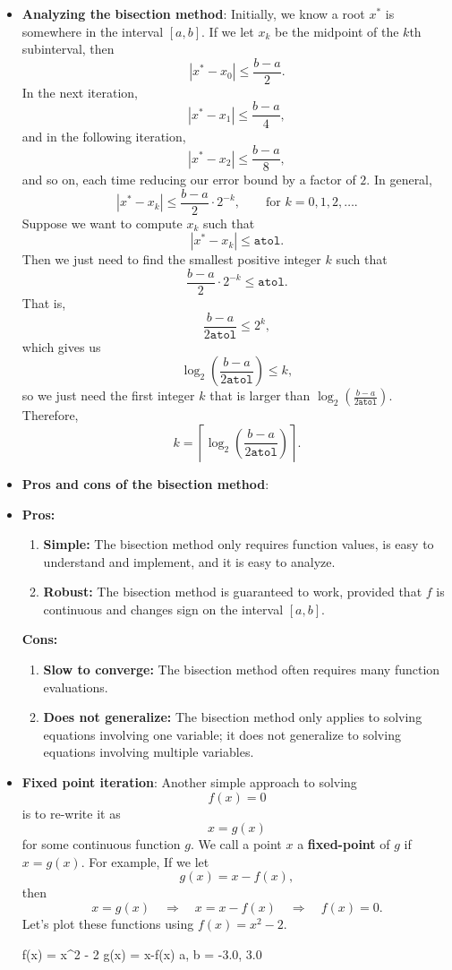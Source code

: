 \documentclass{report}
\begin{document}
\begin{itemize}
\item \textbf{Analyzing the bisection method}:
    Initially, we know a root $x^*$ is somewhere in the interval $[a,b]$. If we let $x_k$ be the midpoint of the $k$th subinterval, then
    $$\left|x^* - x_0\right| \leq \frac{b-a}{2}.$$
    In the next iteration, 
    $$\left|x^* - x_1\right| \leq \frac{b-a}{4},$$
    and in the following iteration,
    $$\left|x^* - x_2\right| \leq \frac{b-a}{8},$$
    and so on, each time reducing our error bound by a factor of $2$.
    In general,
    $$\left|x^* - x_k\right| \leq \frac{b-a}{2} \cdot 2^{-k}, 
    \qquad \text{for $k = 0,1,2,\ldots$}.$$
    Suppose we want to compute $x_k$ such that 
    $$\left|x^* - x_k\right| \leq \mathtt{atol}.$$
    Then we just need to find the smallest positive integer $k$ such that
    $$\frac{b-a}{2} \cdot 2^{-k} \leq \mathtt{atol}.$$
    That is,
    $$\frac{b-a}{2\mathtt{atol}} \leq 2^k,$$
    which gives us
    $$\log_2\left(\frac{b-a}{2\mathtt{atol}}\right) \leq k,$$
    so we just need the first integer $k$ that is larger than $\log_2\left(\frac{b-a}{2\mathtt{atol}}\right)$. Therefore, 
    $$k = \left\lceil \log_2\left(\frac{b-a}{2\mathtt{atol}}\right) \right\rceil.$$
\item \textbf{Pros and cons of the bisection method}:
\item \textbf{Pros:}
    \begin{enumerate}
        \item \textbf{Simple:} The bisection method only requires function values, is easy to understand and implement, and it is easy to analyze.
        \item \textbf{Robust:} The bisection method is guaranteed to work, provided that $f$ is continuous and changes sign on the interval $[a,b]$.
    \end{enumerate}
\textbf{Cons:}
\begin{enumerate}
    \item \textbf{Slow to converge:} The bisection method often requires many function evaluations.
    \item \textbf{Does not generalize:} The bisection method only applies to solving equations involving one variable; it does not generalize to solving equations involving multiple variables.
\end{enumerate}
\item \textbf{Fixed point iteration}:
    Another simple approach to solving 
    $$f(x) = 0$$
    is to re-write it as
    $$x = g(x)$$
    for some continuous function $g$. We call a point $x$ a \textbf{fixed-point} of $g$ if $x = g(x)$.
    \bigbreak \noindent 
    For example, If we let 
    $$g(x) = x - f(x),$$ 
    then
    $$x = g(x) \quad \Rightarrow \quad x = x - f(x) \quad \Rightarrow \quad f(x) = 0.$$
    Let's plot these functions using $f(x) = x^2 - 2.$
    \bigbreak \noindent 
    \begin{jlcode}
f(x) = x^2 - 2
g(x) = x-f(x)
a, b = -3.0, 3.0


\end{jlcode}
\end{itemize}
\end{document}
